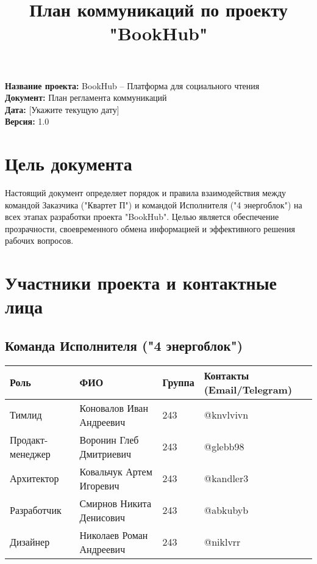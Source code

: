 \documentclass[12pt,a4paper]{article}
\title{\textbf{План коммуникаций по проекту "BookHub"}}
\author{}
\date{}
\begin{document}
\maketitle

\vspace{1cm}

\begin{center}
\textbf{Название проекта:} BookHub – Платформа для социального чтения \\
\textbf{Документ:} План регламента коммуникаций \\
\textbf{Дата:} [Укажите текущую дату] \\
\textbf{Версия:} 1.0
\end{center}

\vspace{1cm}

\section{Цель документа}

Настоящий документ определяет порядок и правила взаимодействия между командой Заказчика ("Квартет П") и командой Исполнителя ("4 энергоблок") на всех этапах разработки проекта "BookHub". Целью является обеспечение прозрачности, своевременного обмена информацией и эффективного решения рабочих вопросов.

\section{Участники проекта и контактные лица}

\subsection{Команда Исполнителя ("4 энергоблок")}

\begin{table}[h]
\centering
\begin{tabular}{|p{3cm}|p{4cm}|p{1.5cm}|p{3cm}|}
\hline
\textbf{Роль} & \textbf{ФИО} & \textbf{Группа} & \textbf{Контакты (Email/Telegram)} \\
\hline
Тимлид & Коновалов Иван Андреевич & 243 & @knvlvivn \\
\hline
Продакт-менеджер & Воронин Глеб Дмитриевич & 243 & @glebb98 \\
\hline
Архитектор & Ковальчук Артем Игоревич & 243 & @kandler3 \\
\hline
Разработчик & Смирнов Никита Денисович & 243 & @abkubyb \\
\hline
Дизайнер & Николаев Роман Андреевич & 243 & @niklvrr \\
\hline
\end{tabular}
\end{table}
\end{document}
